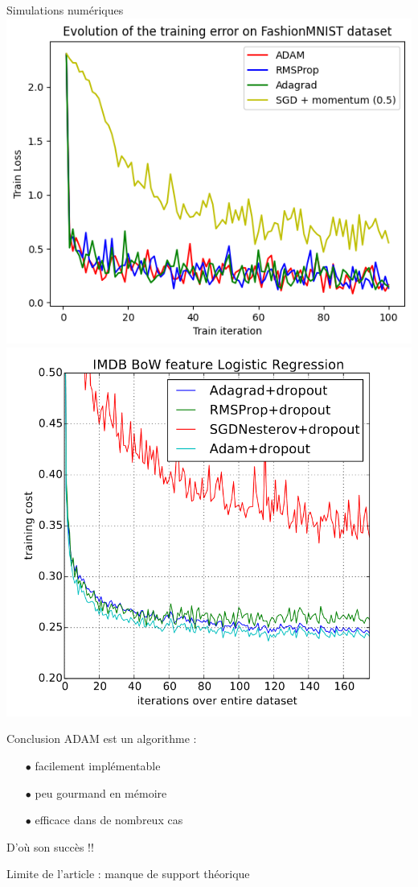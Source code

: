 \documentclass[11pt,aspectratio=169,xcolor=dvipsnames, french]{beamer}
\begin{document}
\begin{frame}{Simulations numériques}
  \includegraphics[width=0.45\linewidth]{../Images/FashionMNIST.png} \hfill \includegraphics[width=0.45\linewidth]{../Images/IMDB_article.png}
\end{frame}

\begin{frame}{Conclusion}
ADAM est un algorithme :  

\begin{itemize}
\item[$\bullet$] facilement implémentable 
\item[$\bullet$] peu gourmand en mémoire
\item[$\bullet$] efficace dans de nombreux cas
\end{itemize}

D'où son succès !! 

Limite de l'article : manque de support théorique

\end{frame}
\end{document}

